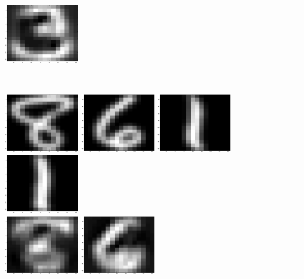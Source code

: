 \documentclass{article}
\begin{document}
\includegraphics[width=0.25\textwidth]{H_tes4.eps}\\[1em]
\rule{1.09\textwidth}{0.4pt}\\[1em]
\includegraphics[width=0.25\textwidth]{tes_original5.eps}\hspace{0.03\textwidth}%
\includegraphics[width=0.25\textwidth]{tes_original6.eps}\hspace{0.03\textwidth}%
\includegraphics[width=0.25\textwidth]{tes_original7.eps}\hspace{0.03\textwidth}%
\includegraphics[width=0.25\textwidth]{tes_original8.eps}\\[1em]
\includegraphics[width=0.25\textwidth]{H_tes5.eps}\hspace{0.03\textwidth}%
\includegraphics[width=0.25\textwidth]{H_tes6.eps}\hspace{0.03\textwidth}%
\end{document}
